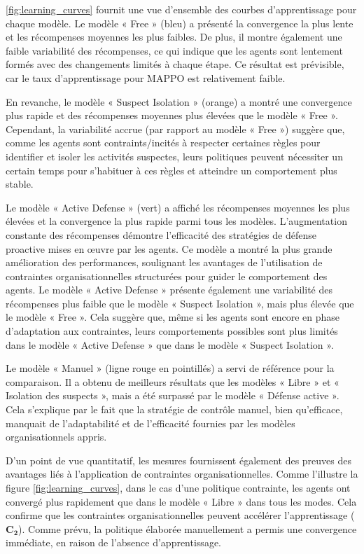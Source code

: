 \autoref{fig:learning_curves} fournit une vue d'ensemble des courbes d'apprentissage pour chaque modèle. Le modèle « Free » (bleu) a présenté la convergence la plus lente et les récompenses moyennes les plus faibles. De plus, il montre également une faible variabilité des récompenses, ce qui indique que les agents sont lentement formés avec des changements limités à chaque étape. Ce résultat est prévisible, car le taux d'apprentissage pour MAPPO est relativement faible.

En revanche, le modèle « Suspect Isolation » (orange) a montré une convergence plus rapide et des récompenses moyennes plus élevées que le modèle « Free ». Cependant, la variabilité accrue (par rapport au modèle « Free ») suggère que, comme les agents sont contraints/incités à respecter certaines règles pour identifier et isoler les activités suspectes, leurs politiques peuvent nécessiter un certain temps pour s'habituer à ces règles et atteindre un comportement plus stable.

Le modèle « Active Defense » (vert) a affiché les récompenses moyennes les plus élevées et la convergence la plus rapide parmi tous les modèles. L'augmentation constante des récompenses démontre l'efficacité des stratégies de défense proactive mises en œuvre par les agents. Ce modèle a montré la plus grande amélioration des performances, soulignant les avantages de l'utilisation de contraintes organisationnelles structurées pour guider le comportement des agents. Le modèle « Active Defense » présente également une variabilité des récompenses plus faible que le modèle « Suspect Isolation », mais plus élevée que le modèle « Free ». Cela suggère que, même si les agents sont encore en phase d'adaptation aux contraintes, leurs comportements possibles sont plus limités dans le modèle « Active Defense » que dans le modèle « Suspect Isolation ».

Le modèle « Manuel » (ligne rouge en pointillés) a servi de référence pour la comparaison. Il a obtenu de meilleurs résultats que les modèles « Libre » et « Isolation des suspects », mais a été surpassé par le modèle « Défense active ». Cela s'explique par le fait que la stratégie de contrôle manuel, bien qu'efficace, manquait de l'adaptabilité et de l'efficacité fournies par les modèles organisationnels appris.

D'un point de vue quantitatif, les mesures fournissent également des preuves des avantages liés à l'application de contraintes organisationnelles. Comme l'illustre la figure \autoref{fig:learning_curves}, dans le cas d'une politique contrainte, les agents ont convergé plus rapidement que dans le modèle « Libre » dans tous les modes. Cela confirme que les contraintes organisationnelles peuvent accélérer l'apprentissage ($\mathbf{C_2}$). Comme prévu, la politique élaborée manuellement a permis une convergence immédiate, en raison de l'absence d'apprentissage.

